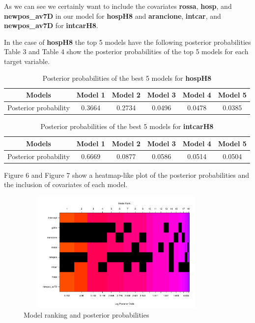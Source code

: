 \documentclass[12pt,a4paper]{article}
\theoremstyle{definition}
\theoremstyle{remark}
\begin{document}
As we can see we certainly want to include the covariates \textbf{rossa}, \textbf{hosp}, and \textbf{newpos\_av7D} in our model for \textbf{hospH8} and \textbf{arancione}, \textbf{intcar}, and \textbf{newpos\_av7D} for \textbf{intcarH8}.

In the case of \textbf{hospH8} the top 5 models have the following posterior probabilities
Table 3 and Table 4 show the posterior probabilities of the top 5 models for each target variable.

\begin{table}[!htb]
	\centering
	\begin{tabular}{|c|c|c|c|c|c|}
		\hline
		Models                & Model 1 & Model 2   & Model 3    & Model 4   & Model 5    \\ \hline
		Posterior probability & 0.3664  & 0.2734 & 0.0496 & 0.0478 & 0.0385 \\ \hline
	\end{tabular}
	\caption{Posterior probabilities of the best 5 models for \textbf{hospH8}}
\end{table}

\begin{table}[!htb]
	\centering
	\begin{tabular}{|c|c|c|c|c|c|}
		\hline
		Models                & Model 1 & Model 2   & Model 3    & Model 4   & Model 5    \\ \hline
		Posterior probability & 0.6669  & 0.0877 & 0.0586 & 0.0514 & 0.0504 \\ \hline
	\end{tabular}
	\caption{Posterior probabilities of the best 5 models for \textbf{intcarH8}}
\end{table}

Figure 6 and Figure 7 show a heatmap-like plot of the posterior probabilities and the inclusion of covariates of each model.

\begin{figure}[!htb]
	\centering
	\includegraphics[width=100mm, height=60mm,scale=0.5]{modelranking.pdf}
	\caption{Model ranking and posterior probabilities }
\end{figure}
\end{document}
